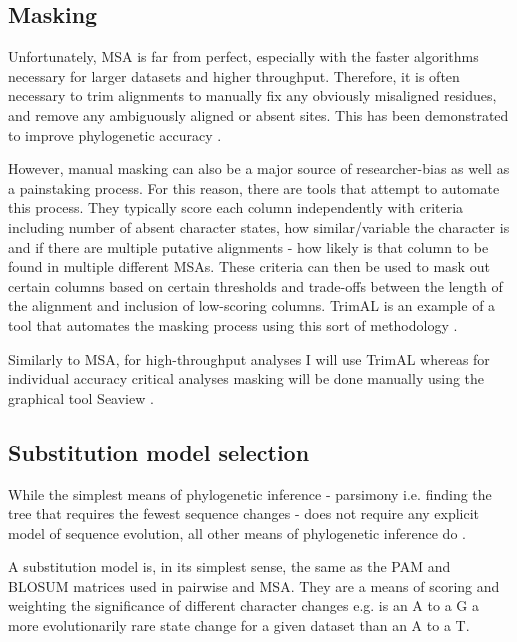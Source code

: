 \subsection{Masking}

Unfortunately, MSA is far from perfect, especially with the faster algorithms 
necessary for larger datasets and higher throughput.  Therefore,
it is often necessary to trim alignments to manually fix any obviously 
misaligned residues, and remove any ambiguously aligned or absent sites.
This has been demonstrated to improve phylogenetic accuracy \citep{Talavera2007}.


However, manual masking can also be a major source of researcher-bias as well
as a painstaking process.  For this reason, there are tools that attempt to 
automate this process.   They typically score each column independently with
criteria including number of absent character states, how similar/variable the
character is and if there are multiple putative alignments - how likely is
that column to be found in multiple different MSAs.
These criteria can then be used to mask out certain columns based on certain
thresholds and trade-offs between the length of the alignment and inclusion
of low-scoring columns.  
TrimAL is an example of a tool that automates the masking process
using this sort of methodology \citep{Capella-Gutierrez2009}.  

Similarly to MSA, for high-throughput analyses I will use TrimAL 
whereas for individual accuracy critical analyses masking will be done
manually using the graphical tool Seaview \citep{Gouy2010}.




\subsection{Substitution model selection}

While the simplest means of phylogenetic inference - parsimony i.e. finding
the tree that requires the fewest sequence changes - does not require any explicit
model of sequence evolution, all other means of phylogenetic inference do \citep{Le2008}.


A substitution model is, in its simplest sense, the same as the PAM and BLOSUM
matrices used in pairwise and MSA.  They are a means of scoring and weighting
the significance of different character changes e.g. is an A to a G a more evolutionarily
rare state change for a given dataset than an A to a T.

